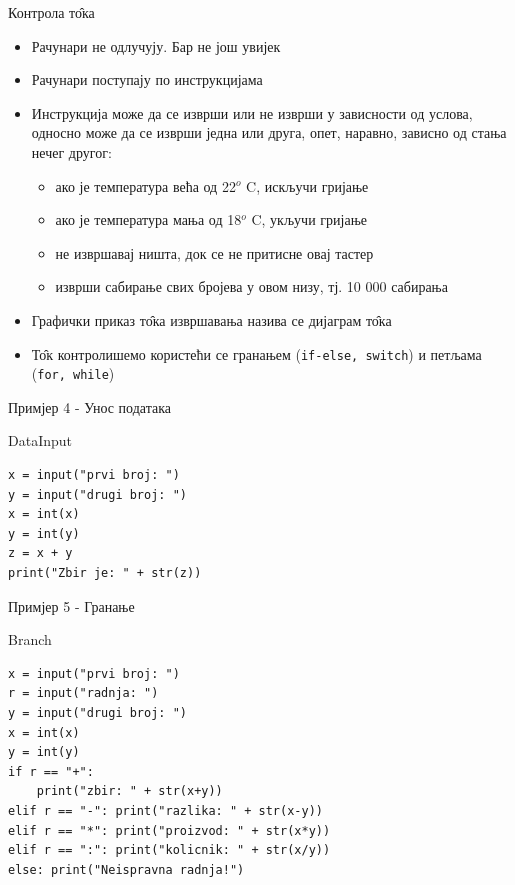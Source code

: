 \documentclass{beamer}
\begin{document}
\begin{frame}{Контрола т\^{о}ка}
\begin{itemize}
    \item Рачунари не одлучују. Бар не још увијек
    \item Рачунари поступају по инструкцијама
    \item Инструкција може да се изврши или не изврши у зависности од услова, односно може да се изврши једна или друга, опет, наравно, зависно од стања нечег другог:
    \begin{itemize}
        \item ако је температура већа од 22$^o$ C, искључи гријање
        \item ако је температура мања од 18$^o$ C, укључи гријање
        \item не извршавај ништа, док се не притисне овај тастер
        \item изврши сабирање свих бројева у овом низу, тј. 10 000 сабирања
    \end{itemize}
    \item Графички приказ т\^{о}ка извршавања назива се дијаграм т\^{о}ка
    \item Т\^{о}к контролишемо користећи се гранањем (\texttt{if-else, switch}) и петљама (\texttt{for, while})
\end{itemize}
\end{frame}

\begin{frame}[fragile]{Примјер 4 - Унос података}
\begin{block}{DataInput}
\begin{lstlisting}
x = input("prvi broj: ")
y = input("drugi broj: ")
x = int(x)
y = int(y)
z = x + y
print("Zbir je: " + str(z))
\end{lstlisting}
\end{block}
\end{frame}

\begin{frame}[fragile]{Примјер 5 - Гранање}
\begin{block}{Branch}
\begin{lstlisting}
x = input("prvi broj: ")
r = input("radnja: ")
y = input("drugi broj: ")
x = int(x)
y = int(y)
if r == "+": 
    print("zbir: " + str(x+y))
elif r == "-": print("razlika: " + str(x-y))
elif r == "*": print("proizvod: " + str(x*y))
elif r == ":": print("kolicnik: " + str(x/y))
else: print("Neispravna radnja!")
\end{lstlisting}
\end{block}
\end{frame}
\end{document}
